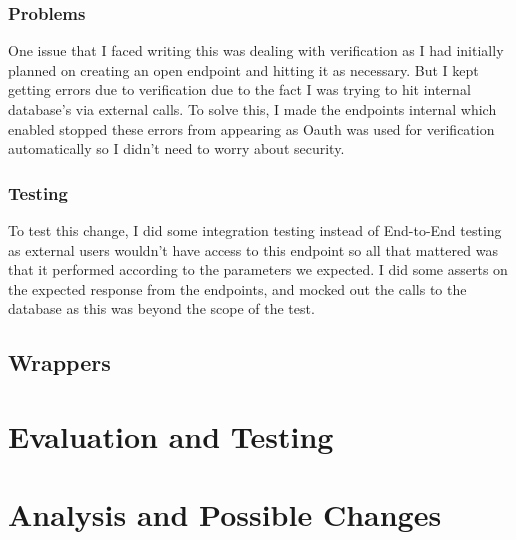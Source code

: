 \subsubsection{Problems}
One issue that I faced writing this was dealing with verification as I had initially planned on creating an open endpoint and hitting it as necessary. But I kept getting errors due to verification due to the fact I was trying to hit internal database's via external calls. To solve this, I made the endpoints internal which enabled stopped these errors from appearing as Oauth was used for verification automatically so I didn't need to worry about security.

\subsubsection{Testing}
To test this change, I did some integration testing instead of End-to-End testing as external users wouldn't have access to this endpoint so all that mattered was that it performed according to the parameters we expected. I did some asserts on the expected response from the endpoints, and mocked out the calls to the database as this was beyond the scope of the test. 


\subsection{Wrappers}

\section{Evaluation and Testing}
\section{Analysis and Possible Changes}
